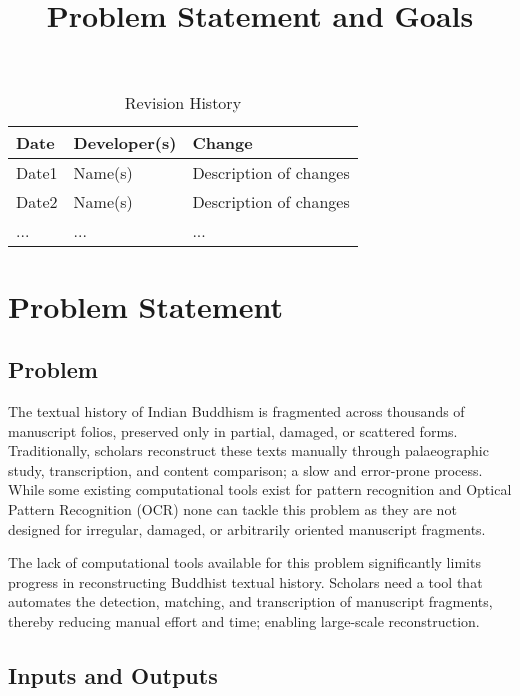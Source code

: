 \documentclass{article}
\title{Problem Statement and Goals\\\progname}
\author{\authname}
\date{}
\begin{document}
\maketitle

\begin{table}[hp]
\caption{Revision History} \label{TblRevisionHistory}
\begin{tabularx}{\textwidth}{llX}
\toprule
\textbf{Date} & \textbf{Developer(s)} & \textbf{Change}\\
\midrule
Date1 & Name(s) & Description of changes\\
Date2 & Name(s) & Description of changes\\
... & ... & ...\\
\bottomrule
\end{tabularx}
\end{table}

\section{Problem Statement}



\subsection{Problem}
The textual history of Indian Buddhism is fragmented across thousands of manuscript folios, preserved only in partial, damaged, or scattered forms. Traditionally, scholars reconstruct these texts manually through palaeographic study, transcription, and content comparison; a slow and error-prone process. While some existing computational tools exist for pattern recognition and Optical Pattern Recognition (OCR) none can tackle this problem as they are not designed for irregular, damaged, or arbitrarily oriented manuscript fragments. 

The lack of computational tools available for this problem significantly limits progress in reconstructing Buddhist textual history. Scholars need a tool that automates the detection, matching, and transcription of manuscript fragments, thereby reducing manual effort and time; enabling large-scale reconstruction.

\subsection{Inputs and Outputs}
\end{document}
